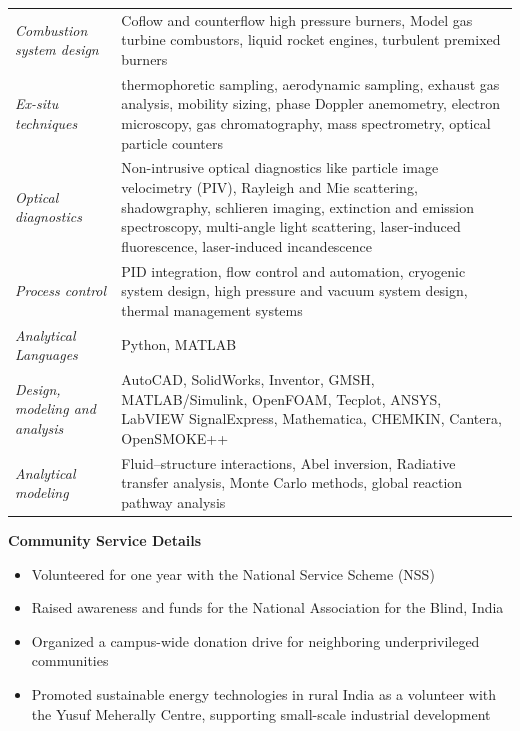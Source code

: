 \documentclass[11pt,a4paper]{article}
\begin{document}
\noindent
\begin{tabular}{@{}p{2in}p{4.3in}}
	{\it Combustion system design} & Coflow and counterflow high pressure burners, Model gas turbine combustors, liquid rocket engines, turbulent premixed burners\vspace*{4pt}\\
	{\it Ex-situ techniques} & thermophoretic sampling, aerodynamic sampling, exhaust gas analysis, mobility sizing, phase Doppler anemometry, electron microscopy, gas chromatography, mass spectrometry, optical particle counters\vspace*{4pt}\\
	{\it Optical diagnostics} & Non-intrusive optical diagnostics like particle image velocimetry (PIV), Rayleigh and Mie scattering, shadowgraphy, schlieren imaging, extinction and emission spectroscopy, multi-angle light scattering, laser-induced fluorescence, laser-induced incandescence\vspace*{4pt}\\
	{\it Process control} & PID integration, flow control and automation, cryogenic system design, high pressure and vacuum system design, thermal management systems\vspace*{4pt}\\
	{\it Analytical Languages} & Python, MATLAB\vspace*{4pt}\\
	{\it Design, modeling and analysis}& AutoCAD, SolidWorks, Inventor, GMSH, MATLAB/Simulink, OpenFOAM, Tecplot, ANSYS, LabVIEW SignalExpress, Mathematica, CHEMKIN, Cantera, OpenSMOKE++\vspace*{4pt}\\
	{\it Analytical modeling}& Fluid--structure interactions, Abel inversion, Radiative transfer analysis, Monte Carlo methods, global reaction pathway analysis\vspace*{4pt}\\
\end{tabular}


\vspace*{10pt}


\vspace*{6pt}
\noindent\textbf{Community Service Details}
	\begin{itemize}
		\item Volunteered for one year with the National Service Scheme (NSS)
		\item Raised awareness and funds for the National Association for the Blind, India
		\item Organized a campus-wide donation drive for neighboring underprivileged communities
		\item Promoted sustainable energy technologies in rural India as a volunteer with the Yusuf Meherally Centre, supporting small-scale industrial development
	\end{itemize}
\end{document}
